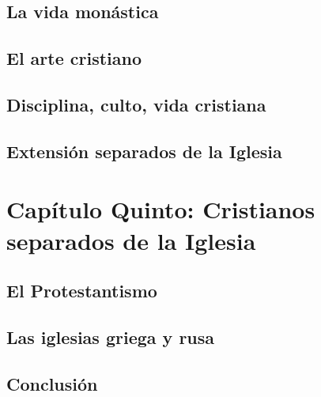 \raggedbottom{} \documentclass[12pt, a4paper]{book}
\begin{document}
\section{La vida monástica}
\section{El arte cristiano}
\section{Disciplina, culto, vida cristiana}
\section{Extensión separados de la Iglesia}
\chapter{Capítulo Quinto: Cristianos separados de la Iglesia}
\section{El Protestantismo}
\section{Las iglesias griega y rusa}
\section{Conclusión}
\end{document}
